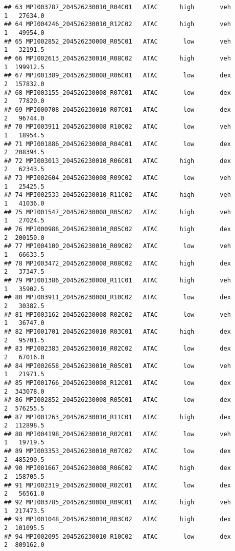 \documentclass[
]{article}
\begin{document}
\begin{verbatim}
## 63 MPI003787_204526230010_R04C01   ATAC      high       veh         1   27634.0
## 64 MPI004246_204526230010_R12C02   ATAC      high       veh         1   49954.0
## 65 MPI002852_204526230008_R05C01   ATAC       low       veh         1   32191.5
## 66 MPI002613_204526230010_R08C02   ATAC      high       veh         1  199912.5
## 67 MPI001389_204526230008_R06C01   ATAC       low       dex         2  157832.0
## 68 MPI003155_204526230008_R07C01   ATAC       low       dex         2   77820.0
## 69 MPI000708_204526230010_R07C01   ATAC       low       dex         2   96744.0
## 70 MPI003911_204526230008_R10C02   ATAC       low       veh         1   18954.5
## 71 MPI001886_204526230008_R04C01   ATAC       low       dex         2  208394.5
## 72 MPI003013_204526230010_R06C01   ATAC      high       dex         2   62343.5
## 73 MPI002604_204526230008_R09C02   ATAC       low       veh         1   25425.5
## 74 MPI002533_204526230010_R11C02   ATAC      high       veh         1   41036.0
## 75 MPI001547_204526230008_R05C02   ATAC      high       veh         1   27024.5
## 76 MPI000988_204526230010_R05C02   ATAC      high       dex         2  200150.0
## 77 MPI004100_204526230010_R09C02   ATAC       low       veh         1   66633.5
## 78 MPI003472_204526230008_R08C02   ATAC      high       dex         2   37347.5
## 79 MPI001386_204526230008_R11C01   ATAC      high       veh         1   35902.5
## 80 MPI003911_204526230008_R10C02   ATAC       low       dex         2   30382.5
## 81 MPI003162_204526230008_R02C02   ATAC       low       veh         1   36747.0
## 82 MPI001701_204526230010_R03C01   ATAC      high       dex         2   95701.5
## 83 MPI002383_204526230010_R02C02   ATAC       low       dex         2   67016.0
## 84 MPI002658_204526230010_R05C01   ATAC       low       veh         1   21971.5
## 85 MPI001766_204526230008_R12C01   ATAC       low       dex         2  343078.0
## 86 MPI002852_204526230008_R05C01   ATAC       low       dex         2  576255.5
## 87 MPI001263_204526230010_R11C01   ATAC      high       dex         2  112898.5
## 88 MPI004198_204526230010_R02C01   ATAC       low       veh         1   19719.5
## 89 MPI003353_204526230010_R07C02   ATAC       low       dex         2  485290.5
## 90 MPI001667_204526230008_R06C02   ATAC      high       dex         2  158705.5
## 91 MPI002319_204526230008_R02C01   ATAC       low       dex         2   56561.0
## 92 MPI003785_204526230008_R09C01   ATAC      high       veh         1  217473.5
## 93 MPI001048_204526230010_R03C02   ATAC      high       dex         2  101095.5
## 94 MPI002095_204526230010_R10C02   ATAC       low       dex         2  809162.0

\end{verbatim}
\end{document}
